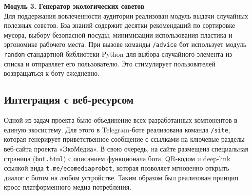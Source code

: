\textbf{Модуль 3. Генератор экологических советов}\\
Для поддержания вовлеченности аудитории реализован модуль выдачи случайных полезных советов. Бза знаний содержит десятки рекомендаций по сортировке мусора, выбору безопасной посуды, минимизации использования пластика и эргономике рабочего места. При вызове команды \texttt{/advice} бот использует модуль \texttt{random} стандартной библиотеки Python для выбора случайного элемента из списка и отправляет его пользователю. Это стимулирует пользователей возвращаться к боту ежедневно.

\subsection{Интеграция с веб-ресурсом}
Одной из задач проекта было объединение всех разработанных компонентов в единую экосистему. Для этого в Telegram-боте реализована команда \texttt{/site}, которая генерирует приветственное сообщение с ссылками на ключевые разделы веб-сайта проекта «ЭкоМедиа». В свою очередь, на сайте размещена специальная страница (\texttt{bot.html}) с описанием функционала бота, QR-кодом и deep-link ссылкой вида \texttt{t.me/ecomediaprobot}, которая позволяет мгновенно открыть диалог с ботом на любом устройстве. Таким образом был реализован принцип кросс-платформенного медиа-потребления.

